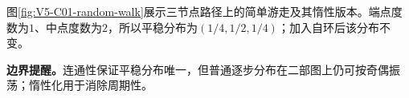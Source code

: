\documentclass[UTF8,a4paper,11pt,openany]{ctexbook}
\begin{document}
\setcounter{page}{712}
\setcounter{chapter}{30}
\setcounter{figure}{6}
\pagestyle{headings}
图\ref{fig:V5-C01-random-walk}展示三节点路径上的简单游走及其惰性版本。端点度数为$1$、中点度数为$2$，所以平稳分布为$(1/4,\allowbreak 1/2,\allowbreak 1/4)$；加入自环后该分布不变。

\textbf{边界提醒。}连通性保证平稳分布唯一，但普通逐步分布在二部图上仍可按奇偶振荡；惰性化用于消除周期性。
\end{document}
